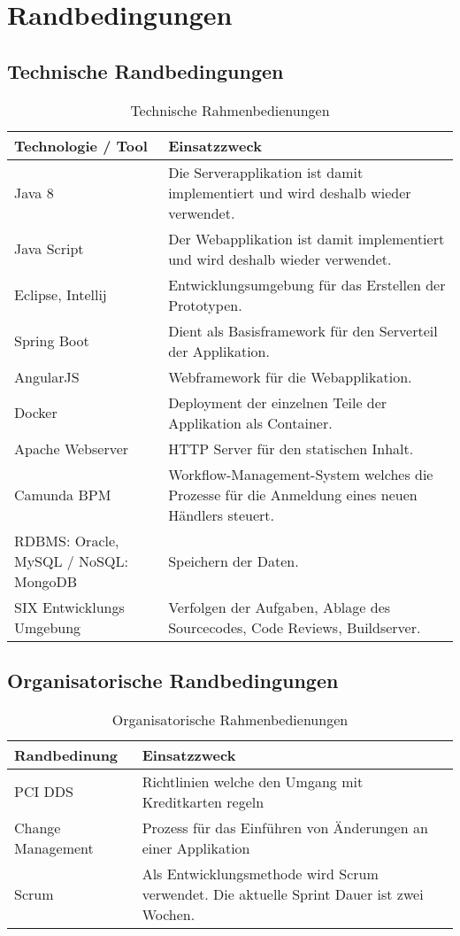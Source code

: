 \chapter{Randbedingungen}

\section{Technische Randbedingungen}

\begin{table}[H]
	\centering
	\caption{Technische Rahmenbedienungen}
	\begin{tabular}{ | p{4cm} | p{12cm} | }
		\toprule
		{\textbf{Technologie / Tool}} & {\textbf{Einsatzzweck}} \\
		\midrule
		Java 8 & Die Serverapplikation ist damit implementiert und wird deshalb wieder verwendet. \\ \hline
		Java Script & Der Webapplikation ist damit implementiert und wird deshalb wieder verwendet. \\ \hline
		Eclipse, Intellij & Entwicklungsumgebung für das Erstellen der Prototypen. \\ \hline
		Spring Boot & Dient als Basisframework für den Serverteil der Applikation.  \\ \hline
		AngularJS & Webframework für die Webapplikation. \\ \hline
		Docker & Deployment der einzelnen Teile der Applikation als Container. \\ \hline
		Apache Webserver & HTTP Server für den statischen Inhalt. \\ \hline
		Camunda BPM & Workflow-Management-System welches die Prozesse für die Anmeldung eines neuen Händlers steuert. \\ \hline
		RDBMS: Oracle, MySQL / NoSQL: MongoDB & Speichern der Daten. \\ \hline
		SIX Entwicklungs Umgebung  & Verfolgen der Aufgaben, Ablage des Sourcecodes, Code Reviews, Buildserver.\\
		\bottomrule
	\end{tabular}
\end{table}

\section{Organisatorische Randbedingungen}

\begin{table}[H]
	\centering
	\caption{Organisatorische Rahmenbedienungen}
	\begin{tabular}{ | p{4cm} | p{12cm} | }
		\toprule
		{\textbf{Randbedinung}} & {\textbf{Einsatzzweck}} \\
		\midrule
		PCI DDS & Richtlinien welche den Umgang mit Kreditkarten regeln \\ \hline
		Change Management & Prozess für das Einführen von Änderungen an einer Applikation\\ \hline
		Scrum & Als Entwicklungsmethode wird Scrum verwendet. Die aktuelle Sprint Dauer ist zwei Wochen.\\ 
		\bottomrule
	\end{tabular}
\end{table}

